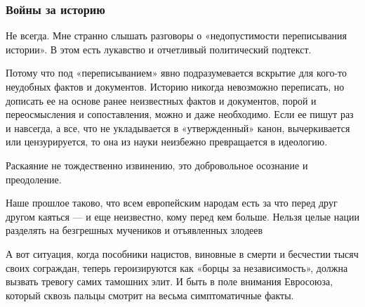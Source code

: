  
 
 
 
 

\subsubsection{Войны за историю}
\label{sec:02_12_2020.news.ru.lenta_ru.mozzhuhin_andrei.1.pribaltika.vojny_za_istoriju}


Не всегда. Мне странно слышать разговоры о «недопустимости переписывания
истории». В этом есть лукавство и отчетливый политический подтекст.

Потому что под «переписыванием» явно подразумевается вскрытие для кого-то
неудобных фактов и документов. Историю никогда невозможно переписать, но
дописать ее на основе ранее неизвестных фактов и документов, порой и
переосмысления и сопоставления, можно и даже необходимо. Если ее пишут раз и
навсегда, а все, что не укладывается в «утвержденный» канон, вычеркивается или
цензурируется, то она из науки неизбежно превращается в идеологию.


Раскаяние не тождественно извинению, это добровольное осознание и преодоление.

\begin{leftbar}
	\large
Наше прошлое таково, что всем европейским народам есть за что перед друг
другом каяться — и еще неизвестно, кому перед кем больше. Нельзя целые
нации разделять на безгрешных мучеников и отъявленных злодеев
\end{leftbar}

А вот ситуация, когда пособники нацистов, виновные в смерти и бесчестии тысяч
своих сограждан, теперь героизируются как «борцы за независимость», должна
вызвать тревогу самих тамошних элит. И быть в поле внимания Евросоюза, который
сквозь пальцы смотрит на весьма симптоматичные факты.


